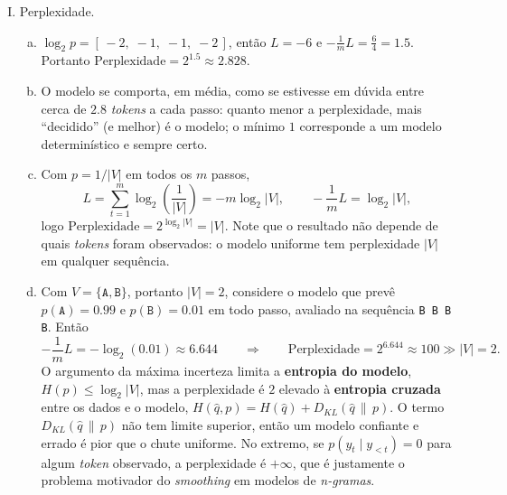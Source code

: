 \documentclass{dlproblemset}
\begin{document}
\begin{enumerate}[I)]
\item Perplexidade.
\begin{enumerate}[(a)]
    \item $\log_2 p = [\,-2,\; -1,\; -1,\; -2\,]$, então $L = -6$ e $-\frac{1}{m} L =
    \frac{6}{4} = 1.5$. Portanto $\text{Perplexidade} = 2^{1.5} \approx 2.828$.
    \item O modelo se comporta, em média, como se estivesse em dúvida entre cerca de $2.8$
    \textit{tokens} a cada passo: quanto menor a perplexidade, mais ``decidido'' (e melhor) é o
    modelo; o mínimo $1$ corresponde a um modelo determinístico e sempre certo.
    \item Com $p = 1/|V|$ em todos os $m$ passos,
    \[
        L = \sum_{t=1}^{m} \log_2\!\left(\frac{1}{|V|}\right) = -m \log_2 |V|,
        \qquad -\frac{1}{m} L = \log_2 |V|,
    \]
    logo $\text{Perplexidade} = 2^{\log_2 |V|} = |V|$. Note que o resultado não depende de quais
    \textit{tokens} foram observados: o modelo uniforme tem perplexidade $|V|$ em qualquer
    sequência.
    \item Com $V = \{\texttt{A}, \texttt{B}\}$, portanto $|V| = 2$, considere o modelo que prevê
    $p(\texttt{A}) = 0.99$ e $p(\texttt{B}) = 0.01$ em todo passo, avaliado na sequência
    \texttt{B B B B}. Então
    \[
        -\frac{1}{m} L = -\log_2(0.01) \approx 6.644
        \qquad \Rightarrow \qquad
        \text{Perplexidade} = 2^{6.644} \approx 100 \gg |V| = 2.
    \]
    O argumento da máxima incerteza limita a \textbf{entropia do modelo},
    $H(p) \le \log_2 |V|$, mas a perplexidade é $2$ elevado à \textbf{entropia cruzada} entre os
    dados e o modelo, $H(\hat{q}, p) = H(\hat{q}) + D_{KL}(\hat{q} \,\|\, p)$. O termo
    $D_{KL}(\hat{q} \,\|\, p)$ não tem limite superior, então um modelo confiante e errado é pior
    que o chute uniforme. No extremo, se $p(y_t \mid y_{<t}) = 0$ para algum \textit{token}
    observado, a perplexidade é $+\infty$, que é justamente o problema motivador do
    \textit{smoothing} em modelos de \textit{n-gramas}.
\end{enumerate}


\end{enumerate}
\end{document}
